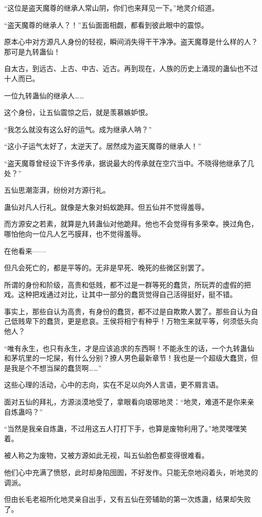 \begin{this_body}
“这位是盗天魔尊的继承人常山阴，你们也来拜见一下。”地灵介绍道。

“盗天魔尊的继承人？！”五仙面面相觑，都看到彼此眼中的震惊。

原本心中对方源凡人身份的轻视，瞬间消失得干干净净。盗天魔尊是什么样的人？那可是九转蛊仙！

自太古，到远古、上古、中古、近古。再到现在，人族的历史上涌现的蛊仙也不过十人而已。

一位九转蛊仙的继承人……

这个身份，让五仙震惊之后，就是羡慕嫉妒恨。

“我怎么就没有这么好的运气。成为继承人呐？”

“这小子运气太好了，太逆天了。居然成为盗天魔尊的继承人！”

“盗天魔尊曾经设下许多传承，据说最大的传承就在空穴当中。不晓得他继承了几处？”

五仙思潮澎湃，纷纷对方源行礼。

蛊仙对凡人行礼。就像是大象对蚂蚁跪拜。但五仙并不觉得羞辱。

而方源安之若素，就算是九转蛊仙对他跪拜。他也不会觉得有多荣幸。换过角色，哪怕他向一位凡人乞丐膜拜，也不觉得羞辱。

在他看来——

但凡会死亡的，都是平等的。无非是早死、晚死的些微区别罢了。

所谓的身份和阶级，高贵和低贱，都不过是一群等死的蠢货，所玩弄的虚假的把戏。这种把戏通过对比，让其中一部分的蠢货觉得自己活得挺好，挺不错。

事实上，那些自认为高贵，有身份的蠢货，都不过是自欺欺人罢了。那些自认为自己低贱卑下的蠢货，更是悲哀。王侯将相宁有种乎！万物生来就平等，何须低头向他人？

“唯有永生，也只有永生，才是应该追求的东西啊！不能永生的话，一个九转蛊仙和茅坑里的一坨屎，有什么分别？撩人男色最新章节！我也是一个超级大蠢货，但是我是个不想当屎的蠢货啊……”

这些心理的活动，心中的志向，实在不足以向外人言语，更不屑言语。

面对五仙的拜礼，方源淡漠地受了，拿眼看向琅琊地灵：“地灵，难道不是你来亲自炼蛊吗？”

“当然是我亲自炼蛊，不过用这五人打打下手，也算是废物利用了。”地灵嘿嘿笑着。

被人称之为废物，又被方源如此无视，叫五仙脸色都变得很难看。

他们心中充满了愤怒，此时却身陷囹圄，不好发作。只能无奈地闷着头，听地灵的调派。

但由长毛老祖所化地灵亲自出手，又有五仙在旁辅助的第一次炼蛊，结果却失败了。


\end{this_body}
